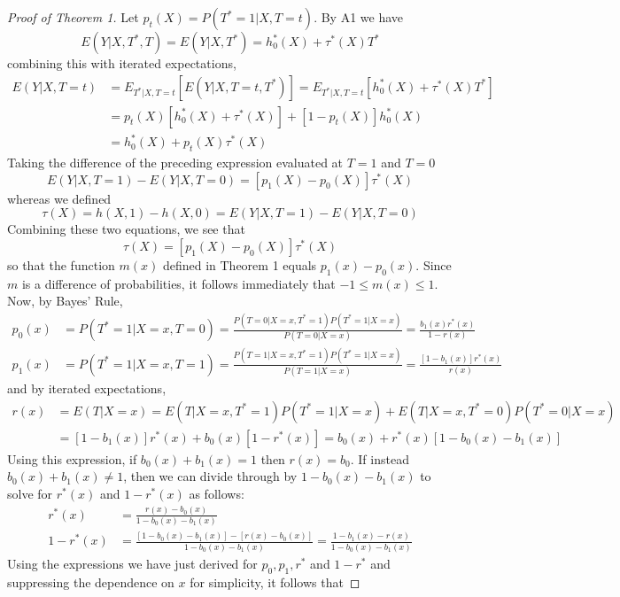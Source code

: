 \documentclass[12pt]{article}
\begin{document}

\begin{proof}[Proof of Theorem 1]
Let $p_t(X) = P(T^*=1|X,T=t)$. 
By A1 we have 
\[
  E(Y|X,T^*,T) = E(Y|X,T^*) = h^*_0(X) + \tau^*(X) T^*
\]
combining this with iterated expectations, 
\begin{align*}
  E(Y|X,T=t) &= E_{T^*|X,T=t}\left[ E(Y|X,T=t,T^*) \right] = E_{T^*|X,T=t}\left[ h^*_0(X) + \tau^*(X) T^* \right]\\
  &= p_t(X) \left[ h^*_0(X) + \tau^*(X) \right] + \left[ 1 - p_t(X) \right] h^*_0(X)\\
  &= h^*_0(X) + p_t(X) \tau^*(X)
\end{align*}
Taking the difference of the preceding expression evaluated at $T=1$ and $T=0$
\[
  E(Y|X,T=1) - E(Y|X,T=0) = \left[p_1(X) - p_0(X)\right] \tau^*(X)
\]
whereas we defined 
\[
  \tau(X) = h(X,1) - h(X,0) = E(Y|X,T=1) - E(Y|X,T=0)
\]
Combining these two equations, we see that
\[
  \tau(X) = \left[ p_1(X) - p_0(X) \right] \tau^*(X) 
\]
so that the function $m(x)$ defined in Theorem 1 equals $p_1(x) - p_0(x)$.
Since $m$ is a difference of probabilities, it follows immediately that $-1 \leq m(x) \leq 1$.
Now, by Bayes' Rule, 
\begin{align*}
  p_0(x) &= P(T^*=1|X=x,T=0) = \frac{P(T=0|X=x,T^*=1)P(T^*=1|X=x)}{P(T=0|X=x)} = \frac{b_1(x) r^*(x)}{1-r(x)} \\
  p_1(x) &= P(T^*=1|X=x,T=1) = \frac{P(T=1|X=x,T^*=1)P(T^*=1|X=x)}{P(T=1|X=x)} = \frac{[1-b_1(x)] r^*(x)}{r(x)} 
\end{align*}
and by iterated expectations,
\begin{align*}
  r(x) &= E(T|X=x) = E(T|X=x,T^*=1)P(T^*=1|X=x) + E(T|X=x,T^*=0)P(T^*=0|X=x)\\ 
    &= [1 - b_1(x)]r^*(x) + b_0(x) [1 - r^*(x)] = b_0(x) + r^*(x)[1 - b_0(x) - b_1(x)] 
\end{align*}
Using this expression, if $b_0(x) + b_1(x) = 1$ then $r(x) = b_0$.
If instead $b_0(x) + b_1(x) \neq 1$, then we can divide through by $1 - b_0(x) - b_1(x)$ to solve for $r^*(x)$ and $1 - r^*(x)$ as follows:
\begin{align*}
  r^*(x) &= \frac{r(x) - b_0(x)}{1 - b_0(x) - b_1(x)}\\
  1 - r^*(x) &= \frac{[1 - b_0(x) - b_1(x)] - [r(x) - b_0(x)]}{1 - b_0(x) - b_1(x)} = \frac{1 - b_1(x) - r(x)}{1 - b_0(x) - b_1(x)}
\end{align*}
Using the expressions we have just derived for $p_0, p_1, r^*$ and $1 - r^*$ and suppressing the dependence on $x$ for simplicity, it follows that

\end{proof}
\end{document}
